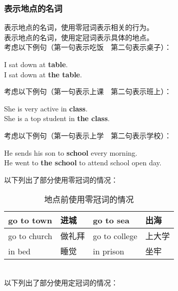 \documentclass[UTF8]{ctexart}
\begin{document}
\subsubsection{表示地点的名词}
    表示地点的名词，使用零冠词表示相关的行为。\\[3mm]
    表示地点的名词，使用定冠词表示具体的地点。\\[3mm]
    考虑以下例句（第一句表示吃饭~~第二句表示桌子）：
    \begin{center}
        \large\ttfamily
        I sat down at \textbf{table}.\\[3mm]
        I sat down at \textbf{the table}.\\[6mm]
    \end{center}
    考虑以下例句（第一句表示上课~~第二句表示班上）：
    \begin{center}
        \large\ttfamily
        She is very active in \textbf{class}.\\[3mm]
        She is a top student in \textbf{the class}.\\[6mm]
    \end{center}
    考虑以下例句（第一句表示上学~~第二句表示学校）：
    \begin{center}
        \large\ttfamily
        He sends his son to \textbf{school} every morning.\\[3mm]
        He went to \textbf{the school} to attend school open day.\\[6mm]
    \end{center}
    以下列出了部分使用零冠词的情况：\vspace{5pt}
    \begin{table}[h]
        \begin{center}
            \ttfamily
            \begin{tabular}{p{110pt}|p{60pt}|p{110pt}|p{60pt}}
                \hline
                go to town&进城&go to sea&出海\\ \hline
                go to church&做礼拜&go to college&上大学\\ \hline
                in bed&睡觉&in prison&坐牢\\ \hline
            \end{tabular}
            \rmfamily
            \caption{地点前使用零冠词的情况}
        \end{center}
    \end{table}\\
    以下列出了部分使用定冠词的情况：\vspace{5pt}
\end{document}
